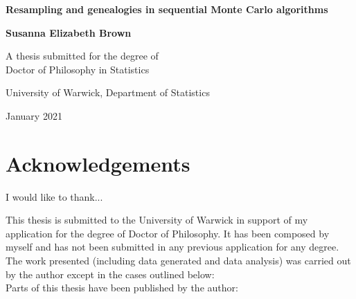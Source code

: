 \documentclass[oneside]{scrbook} %
\theoremstyle{definition}
\newcommand{\1}[1]{\mathbbm{1}_{#1}}
\begin{document}
\begin{titlepage}
\centering
\vspace*{5cm}
\begin{LARGE}\bfseries
Resampling and genealogies in sequential Monte Carlo algorithms\par \end{LARGE} 
\vspace{1.5cm} 
\begin{Large}\bfseries
Susanna Elizabeth Brown\par
\end{Large}
\vspace{3cm}
\begin{large}
A thesis submitted for the degree of\\Doctor of Philosophy in Statistics \par
\vspace{1.5cm}
University of Warwick, Department of Statistics \par
\vspace{1.5cm}
January 2021 %
\end{large}
\end{titlepage}


\frontmatter

\tableofcontents
\listoffigures
\listoftables

\chapter{Acknowledgements}
I would like to thank... %
\vspace*{3cm}


This thesis is submitted to the University of Warwick in support of my application for the degree of Doctor of Philosophy. It has been composed by myself and has not been submitted in any previous application for any degree. %
\\[5pt]
The work presented (including data generated and data analysis) was carried out by the author except in the cases outlined below:
\\[5pt]
Parts of this thesis have been published by the author:
\end{document}
